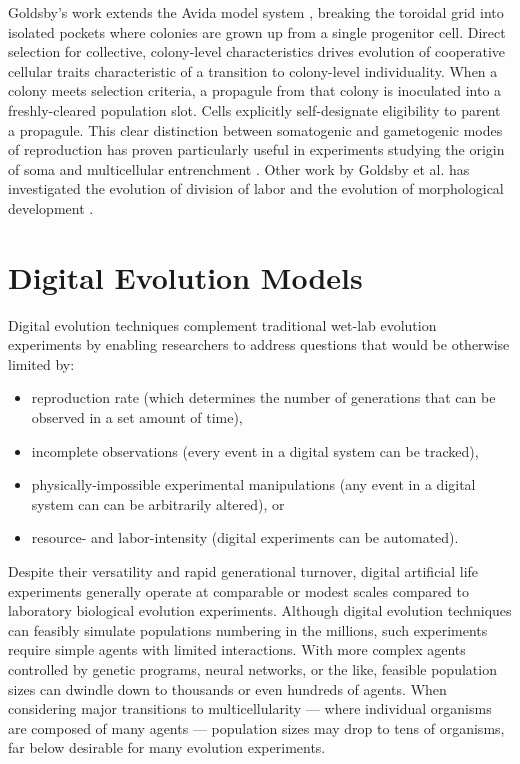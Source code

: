 Goldsby’s work extends the Avida model system \citep{ofria2009artificial}, breaking the toroidal grid into isolated pockets where colonies are grown up from a single progenitor cell.
Direct selection for collective, colony-level characteristics drives evolution of cooperative cellular traits characteristic of a transition to colony-level individuality.
When a colony meets selection criteria, a propagule from that colony is inoculated into a freshly-cleared population slot.
Cells explicitly self-designate eligibility to parent a propagule.
This clear distinction between somatogenic and gametogenic modes of reproduction has proven particularly useful in experiments studying the origin of soma \citep{goldsby2014evolutionary} and multicellular entrenchment \citep{goldsby2020major}.
Other work by Goldsby et al. has investigated the evolution of division of labor \citep{goldsby2010evolution, goldsby2012task} and the evolution of morphological development \citep{goldsby2017increasing}.

\section{Digital Evolution Models}

Digital evolution techniques complement traditional wet-lab evolution experiments by enabling researchers to address questions that would be otherwise limited by:
\begin{itemize}
\item reproduction rate (which determines the number of generations that can be observed in a set amount of time),
\item incomplete observations (every event in a digital system can be tracked),
\item physically-impossible experimental manipulations (any event in a digital system can can be arbitrarily altered), or
\item resource- and labor-intensity (digital experiments can be automated).
\end{itemize}

Despite their versatility and rapid generational turnover, digital artificial life experiments generally operate at comparable or modest scales compared to laboratory biological evolution experiments.
Although digital evolution techniques can feasibly simulate populations numbering in the millions, such experiments require simple agents with limited interactions.
With more complex agents controlled by genetic programs, neural networks, or the like, feasible population sizes can dwindle down to thousands or even hundreds of agents.
When considering major transitions to multicellularity --- where individual organisms are composed of many agents --- population sizes may drop to tens of organisms, far below desirable for many evolution experiments.

